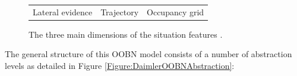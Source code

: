 \begin{figure}
\begin{center}
\begin{tabular}{ccc}
Lateral evidence & Trajectory & Occupancy grid \\
\end{tabular}
\caption{\label{Figure:DaimlerSituationFeatures} The three main dimensions of the situation features \cite{kasper2012object}.}
\end{center}
\end{figure}


The general structure of this OOBN model consists of a number of abstraction levels as detailed in Figure \ref{Figure:DaimlerOOBNAbstraction}: 

